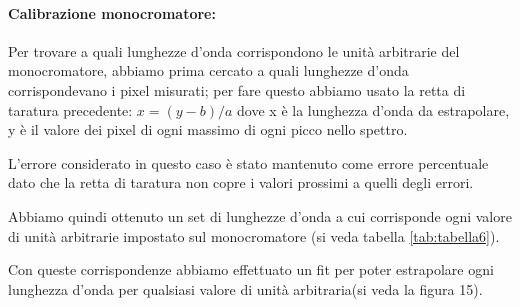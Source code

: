 \documentclass{article}
\begin{document}
\paragraph{Calibrazione monocromatore:}
Per trovare a quali lunghezze d'onda corrispondono le unità arbitrarie del monocromatore, abbiamo prima cercato a quali lunghezze d'onda corrispondevano i pixel misurati; per fare questo abbiamo usato la retta di taratura precedente:
$x=(y-b)/a$
dove x è la lunghezza d'onda da estrapolare, y è il valore dei pixel di ogni massimo di ogni picco nello spettro. 

L'errore considerato in questo caso è stato mantenuto come errore percentuale dato che la retta di taratura non copre i valori prossimi a quelli degli errori.

Abbiamo quindi ottenuto un set di lunghezze d'onda a cui corrisponde ogni valore di unità arbitrarie impostato sul monocromatore (si veda tabella \ref{tab:tabella6}).

Con queste corrispondenze abbiamo effettuato un fit per poter estrapolare ogni lunghezza d'onda per qualsiasi valore di unità arbitraria(si veda la figura 15).
\end{document}
